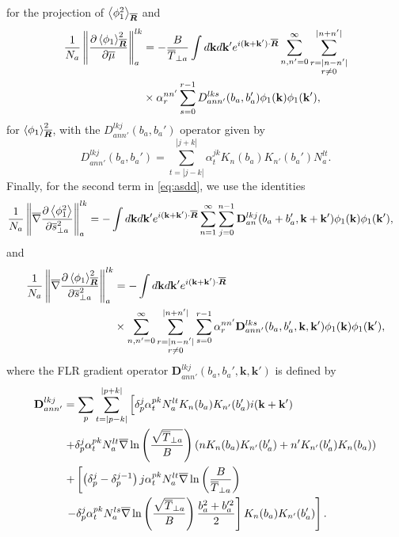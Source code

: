 %
for the projection of $\left<\phi_1^2\right>_{\gyR}$ and
%
\begin{align} \label{momentstarlkpmugyaverphi1gyaverA1}
    \frac{1}{N_a}\moment{lk}{ \frac{\partial \gyaver{\phi_1}_{\gyR}^2}{\partial \gymu}   } &= - \frac{B}{\overline T_{\perp a}} \int d \mathbf k d \mathbf k' e^{i (\mathbf k + \mathbf k') \cdot \gyR} \sum_{n,n' = 0}^\infty  \sum_{\substack{r= |n-n'|\\ r \neq 0}}^{|n +n'|} \nonumber\\
    &\times \alpha_r^{nn'} \sum_{s=0}^{r-1} D_{ann'}^{lks}(b_a,b_a')   \phi_1(\mathbf k)\phi_{1}(\mathbf k') ,
\end{align}
%
for $\left<\phi_1\right>_{\gyR}^2$, with the $D_{ann'}^{lkj}(b_a,b_a')$ operator given by
%
\begin{equation}
     D_{ann'}^{lkj}(b_a,b_a') = \sum_{t = |j-k|}^{|j+k|} \alpha_t^{jk} K_{n}(b_a) K_{n'}(b_a') N_a^{lt}.
\end{equation}
%
Finally, for the second term in \cref{eq:asdd}, we use the identities
%
\begin{align} \label{momentstarlkgradpmugyaverphi1A1}
    \frac{1}{N_a}\moment{lk}{\gygrad \frac{\partial \gyaver{ \phi_1^2 }}{\partial \sperp^2} } & =  -    \int d\mathbf k d \mathbf k' e^{i (\mathbf k + \mathbf k') \cdot \gyR} \sum_{n=1}^\infty \sum_{j =0}^{n-1} \mathbf{{D}}_{a n}^{lkj}(b_a + b_a', \mathbf k +  \mathbf k') \phi_1(\mathbf k)\phi_1(\mathbf k'),
\end{align}
%
and
%
\begin{align} \label{momentstarlkgradpmugyaverphi1gyaverA1}
\frac{1}{N_a}  \moment{lk}{\gygrad \frac{\partial \gyaver{\phi_1}_{\gyR}^2}{\partial \sperp^2}  } &= - \int d \mathbf k d\mathbf k' e^{i (\mathbf k + \mathbf k') \cdot \gyR} \nonumber\\
&\times\sum_{n,n' = 0}^\infty  \sum_{\substack{r= |n-n'| \\ r \neq 0}}^{|n +n'|} \sum_{s=0}^{r-1}  \alpha_r^{nn'} \mathbf{D}_{ann'}^{lks}(b_a,b_a',\mathbf k,\mathbf k')  \phi_1(\mathbf k)\phi_1(\mathbf k') ,
\end{align}
%
where the FLR gradient operator $\mathbf {D}_{ann'}^{lkj}(b_a,b_a',\mathbf k,\mathbf k')$ is defined by
%
 \begin{align} \label{bmDannlkj}
\mathbf{D}_{ann'}^{lkj} & =  \sum_p \sum_{t = |p -k|}^{|p+k|}\left[   \delta_p^j \alpha_t^{pk}  \gyN^{lt} K_{n}(b_a) K_{n'}(b'_a) i (\mathbf k +\mathbf k')  \right. \nonumber \\
&\left.  + \delta_p^j \alpha_t^{pk}  \gyN^{lt}  \gygrad \ln \left( \frac{\sqrt{\gyTperp}}{B}\right) \left(  n K_{n}(b_a) K_{n'}(b_a' )+ n' K_{n'}(b'_a) K_{n}(b_a)\right) \right. \nonumber \\
&  \left. +   \left[  \left( \delta_p^j- \delta_p^{j-1} \right)  j  \alpha_t^{pk}  \gyN^{lt} \gygrad \ln \left( \frac{B}{\Tperp}\right) \right. \right. \nonumber \\
&  \left. \left. -   \delta_p^j  \alpha_t^{pk}  \gyN^{ls}  \gygrad \ln \left( \frac{\sqrt{\gyTperp}}{B}\right) \frac{ b_a^2+b_a'^2}{2}   \right]K_{n}(b_a) K_{n'}(b_a')   \right].
 \end{align}
